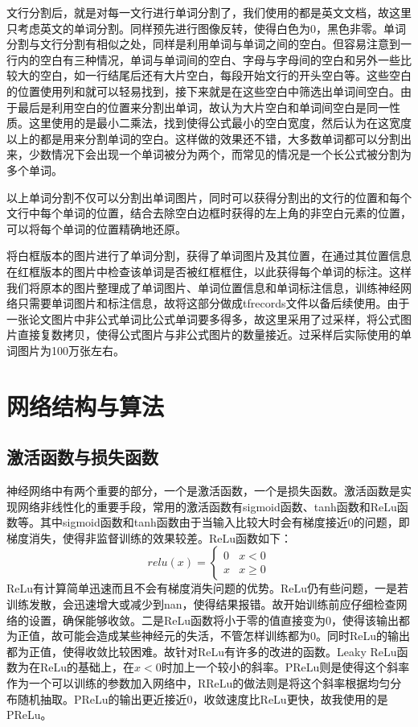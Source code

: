 \documentclass[12pt]{article}
\begin{document}
文行分割后，就是对每一文行进行单词分割了，我们使用的都是英文文档，故这里只考虑英文的单词分割。同样预先进行图像反转，使得白色为0，黑色非零。单词分割与文行分割有相似之处，同样是利用单词与单词之间的空白。但容易注意到一行内的空白有三种情况，单词与单词间的空白、字母与字母间的空白和另外一些比较大的空白，如一行结尾后还有大片空白，每段开始文行的开头空白等。这些空白的位置使用列和就可以轻易找到，接下来就是在这些空白中筛选出单词间空白。由于最后是利用空白的位置来分割出单词，故认为大片空白和单词间空白是同一性质。这里使用的是最小二乘法，找到使得公式最小的空白宽度，然后认为在这宽度以上的都是用来分割单词的空白。这样做的效果还不错，大多数单词都可以分割出来，少数情况下会出现一个单词被分为两个，而常见的情况是一个长公式被分割为多个单词。

以上单词分割不仅可以分割出单词图片，同时可以获得分割出的文行的位置和每个文行中每个单词的位置，结合去除空白边框时获得的左上角的非空白元素的位置，可以将每个单词的位置精确地还原。

将白框版本的图片进行了单词分割，获得了单词图片及其位置，在通过其位置信息在红框版本的图片中检查该单词是否被红框框住，以此获得每个单词的标注。这样我们将原本的图片整理成了单词图片、单词位置信息和单词标注信息，训练神经网络只需要单词图片和标注信息，故将这部分做成tfrecords文件以备后续使用。由于一张论文图片中非公式单词比公式单词要多得多，故这里采用了过采样，将公式图片直接复数拷贝，使得公式图片与非公式图片的数量接近。过采样后实际使用的单词图片为100万张左右。

\section{网络结构与算法}

\subsection{激活函数与损失函数}
\noindent

神经网络中有两个重要的部分，一个是激活函数，一个是损失函数。激活函数是实现网络非线性化的重要手段，常用的激活函数有sigmoid函数、tanh函数和ReLu函数等。其中sigmoid函数和tanh函数由于当输入比较大时会有梯度接近0的问题，即梯度消失，使得非监督训练的效果较差。ReLu函数如下：
$$relu(x) = 
\begin{cases} 
0& x < 0\\
x& x \ge 0
\end{cases}$$
ReLu有计算简单迅速而且不会有梯度消失问题的优势。ReLu仍有些问题，一是若训练发散，会迅速增大或减少到nan，使得结果报错。故开始训练前应仔细检查网络的设置，确保能够收敛。二是ReLu函数将小于零的值直接变为0，使得该输出都为正值，故可能会造成某些神经元的失活，不管怎样训练都为0。同时ReLu的输出都为正值，使得收敛比较困难。故针对ReLu有许多的改进的函数。Leaky ReLu函数为在ReLu的基础上，在$x<0$时加上一个较小的斜率。PReLu则是使得这个斜率作为一个可以训练的参数加入网络中，RReLu的做法则是将这个斜率根据均匀分布随机抽取。PReLu的输出更近接近0，收敛速度比ReLu更快，故我使用的是PReLu。
\end{document}
